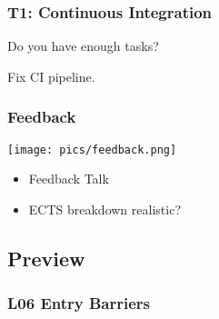 \begin{assignment}
	\frametitle{T1: Continuous Integration}

	\begin{task}
	Do you have enough tasks?
	\end{task}

	\begin{task}
	Fix CI pipeline.
	\end{task}
\end{assignment}

\begin{frame}
	\frametitle{Feedback}

	\hfill \texttt{[image: pics/feedback.png]}
	\vspace{-1cm}
	\begin{itemize}
		\item Feedback Talk
		\item ECTS breakdown realistic?
	\end{itemize}
\end{frame}

\subsection{Preview}

\begin{frame}
	\frametitle{L06 Entry Barriers}
\end{frame}




